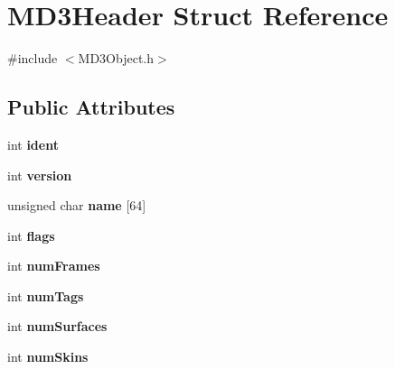 \hypertarget{struct_m_d3_header}{\section{M\-D3\-Header Struct Reference}
\label{struct_m_d3_header}
}


{\ttfamily \#include $<$M\-D3\-Object.\-h$>$}

\subsection*{Public Attributes}
\begin{DoxyCompactItemize}
\item 
\hypertarget{struct_m_d3_header_a14c144a8fc6187c1861629c3c0cd2af5}{int {\bfseries ident}}\label{struct_m_d3_header_a14c144a8fc6187c1861629c3c0cd2af5}

\item 
\hypertarget{struct_m_d3_header_aa731d05c80ff32f8d041db69265e67ac}{int {\bfseries version}}\label{struct_m_d3_header_aa731d05c80ff32f8d041db69265e67ac}

\item 
\hypertarget{struct_m_d3_header_a322f05b1e949072d79abe15db9b31875}{unsigned char {\bfseries name} \mbox{[}64\mbox{]}}\label{struct_m_d3_header_a322f05b1e949072d79abe15db9b31875}

\item 
\hypertarget{struct_m_d3_header_a66d6c33abc3b4d3dd679e946b8b35cce}{int {\bfseries flags}}\label{struct_m_d3_header_a66d6c33abc3b4d3dd679e946b8b35cce}

\item 
\hypertarget{struct_m_d3_header_a7765d906b373b51939996d8b3e4834c4}{int {\bfseries num\-Frames}}\label{struct_m_d3_header_a7765d906b373b51939996d8b3e4834c4}

\item 
\hypertarget{struct_m_d3_header_ac5d842c4959072c4ff0030d9f72f5a6f}{int {\bfseries num\-Tags}}\label{struct_m_d3_header_ac5d842c4959072c4ff0030d9f72f5a6f}

\item 
\hypertarget{struct_m_d3_header_afdb62549299affe3f144965448c81173}{int {\bfseries num\-Surfaces}}\label{struct_m_d3_header_afdb62549299affe3f144965448c81173}

\item 
\hypertarget{struct_m_d3_header_aab8109c1f65ad7d7ca712ea9c08da5fb}{int {\bfseries num\-Skins}}\label{struct_m_d3_header_aab8109c1f65ad7d7ca712ea9c08da5fb}


\end{DoxyCompactItemize}
